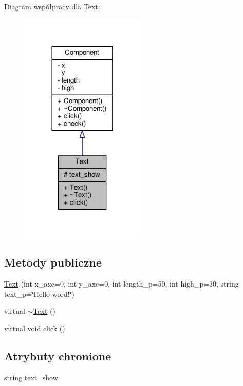 Diagram współpracy dla Text\+:
\nopagebreak
\begin{figure}[H]
\begin{center}
\leavevmode
\includegraphics[width=168pt]{classText__coll__graph}
\end{center}
\end{figure}
\subsection*{Metody publiczne}
\begin{DoxyCompactItemize}
\item 
\hyperlink{classText_a144848b3b22ea514fe2f9c61762af5c3}{Text} (int x\+\_\+axe=0, int y\+\_\+axe=0, int length\+\_\+p=50, int high\+\_\+p=30, string text\+\_\+p=\char`\"{}Hello word!\char`\"{})
\item 
virtual \hyperlink{classText_a068e9e04751fc94f4c45c6cb15af55f4}{$\sim$\+Text} ()
\item 
virtual void \hyperlink{classText_ab334ff82f41302f83bebf3eaf2516a84}{click} ()
\end{DoxyCompactItemize}
\subsection*{Atrybuty chronione}
\begin{DoxyCompactItemize}
\item 
string \hyperlink{classText_a3fd84b688c6971ba8626b910f0bc2ce3}{text\+\_\+show}
\end{DoxyCompactItemize}


